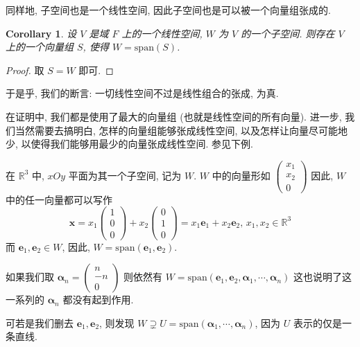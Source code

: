 \documentclass[UTF8]{book}
\newtheorem{corollary}{Corollary}[section]
\begin{document}
同样地, 子空间也是一个线性空间, 因此子空间也是可以被一个向量组张成的. 

\begin{corollary}
    设 $V$ 是域 $F$ 上的一个线性空间, $W$ 为 $V$ 的一个子空间. 
    则存在 $V$ 上的一个向量组 $S$, 使得 $W=\mathrm{span}(S)$.
\end{corollary}

\begin{proof}
    取 $S=W$ 即可. 
\end{proof}

于是乎, 我们的断言: 一切线性空间不过是线性组合的张成, 为真. 

在证明中, 我们都是使用了最大的向量组 (也就是线性空间的所有向量). 
进一步, 我们当然需要去搞明白, 怎样的向量组能够张成线性空间, 
以及怎样让向量尽可能地少, 以使得我们能够用最少的向量张成线性空间. 
参见下例. 

\begin{example}
    在 $\mathbb{R}^3$ 中, $xOy$ 平面为其一个子空间, 记为 $W$. 
    $W$ 中的向量形如 
    $\begin{pmatrix}
        x_1 \\ x_2 \\ 0
    \end{pmatrix}$
    因此, $W$ 中的任一向量都可以写作 
    $$ \boldsymbol{x} = 
    x_1
    \begin{pmatrix}
       1 \\ 0 \\ 0 
    \end{pmatrix}
    + x_2
    \begin{pmatrix}
        0 \\ 1 \\ 0
    \end{pmatrix}
    = x_1\boldsymbol{e}_1 + x_2 \boldsymbol{e}_2,\,
    x_1,x_2\in \mathbb{R}^3 
    $$
    而 $\boldsymbol{e}_1,\boldsymbol{e}_2 \in W$, 
    因此, $W = \mathrm{span}(\boldsymbol{e}_1,\boldsymbol{e}_2)$. 

    如果我们取 $\boldsymbol{\alpha}_n = \begin{pmatrix}
        n \\ -n \\ 0
    \end{pmatrix}$ 
    则依然有 
    $W = \mathrm{span}(\boldsymbol{e}_1,\boldsymbol{e}_2,
    \boldsymbol{\alpha}_1,\cdots,\boldsymbol{\alpha}_n)$ 
    这也说明了这一系列的 $\boldsymbol{\alpha}_n$ 都没有起到作用. 

    可若是我们删去 $\boldsymbol{e}_1,\boldsymbol{e}_2$, 
    则发现 $W\supsetneq U =\mathrm{span}
    (\boldsymbol{\alpha}_1,\cdots,\boldsymbol{\alpha}_n)$, 
    因为 $U$ 表示的仅是一条直线. 
\end{example}
\end{document}
